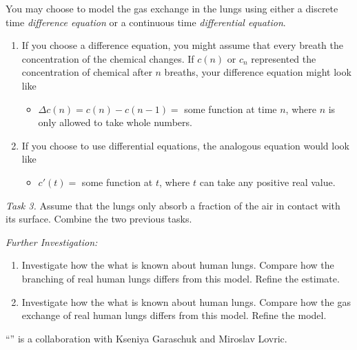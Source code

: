 \begin{graybox}
You may choose to model the gas exchange in the lungs using either a discrete time \emph{difference equation} or a continuous time \emph{differential equation}.
	\begin{enumerate}[label=\emph{(\alph*)}]
	\item If you choose a difference equation, you might assume that every breath the concentration of the chemical changes. If $c(n)$ or $c_n$ represented the concentration of chemical after $n$ breaths, your difference equation might look like
	\begin{itemize}
		\item $\Delta c(n) = c(n) - c(n-1) =$ some function at time $n$, where $n$ is only allowed to take whole numbers.
	\end{itemize}

	\item If you choose to use differential equations, the analogous equation would look like
	\begin{itemize}
		\item $c'(t)=$ some function at $t$, where $t$ can take any positive real value.  
	\end{itemize}
\end{enumerate}
\end{graybox}

\vfill

\emph{Task 3. } Assume that the lungs only absorb a fraction of the air in contact with its surface. Combine the two previous tasks.

\vfill

\emph{Further Investigation:}
\begin{enumerate}[label=\emph{\arabic*.}]
	\item Investigate how the what is known about human lungs. Compare how the branching of real human lungs differs from this model. Refine the estimate.
	\item Investigate how the what is known about human lungs. Compare how the gas exchange of real human lungs differs from this model. Refine the model.
\end{enumerate}

\vspace{1cm}


\begin{graybox}
\hfill ``\lungstitle'' is a collaboration with Kseniya Garaschuk and Miroslav Lovric.
\end{graybox}
\begin{noexercises}
\end{noexercises}
